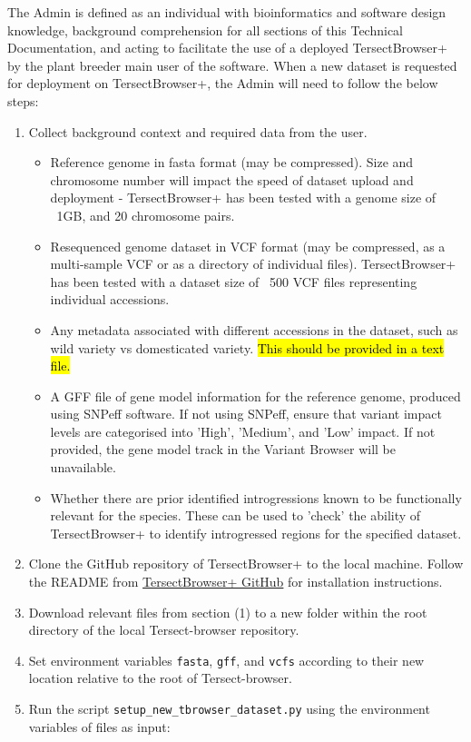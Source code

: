 \documentclass[12pt]{article}
\begin{document}
The Admin is defined as an individual with bioinformatics and software design knowledge, background comprehension for all sections of this Technical Documentation, and acting to facilitate the use of a deployed TersectBrowser+ by the plant breeder main user of the software. When a new dataset is requested for deployment on TersectBrowser+, the Admin will need to follow the below steps:
\begin{enumerate}
    \item Collect background context and required data from the user.
\begin{itemize}
    \item Reference genome in fasta format (may be compressed). Size and chromosome number will impact the speed of dataset upload and deployment - TersectBrowser+ has been tested with a genome size of ~1GB, and 20 chromosome pairs.
    \item Resequenced genome dataset in VCF format (may be compressed, as a multi-sample VCF or as a directory of individual files). TersectBrowser+ has been tested with a dataset size of ~500 VCF files representing individual accessions. 
    \item Any metadata associated with different accessions in the dataset, such as wild variety vs domesticated variety. \hl{This should be provided in a text file.}
    \item A GFF file of gene model information for the reference genome, produced using SNPeff software. If not using SNPeff, ensure that variant impact levels are categorised into 'High', 'Medium', and 'Low' impact. If not provided, the gene model track in the Variant Browser will be unavailable. 
    \item Whether there are prior identified introgressions known to be functionally relevant for the species. These can be used to 'check' the ability of TersectBrowser+ to identify introgressed regions for the specified dataset.
\end{itemize}
    \item Clone the GitHub repository of TersectBrowser+ to the local machine. Follow the README from \hyperlink {https://github.com/Tersect-Browser/Tersect-browser.git}{TersectBrowser+ GitHub} for installation instructions.
    \item Download relevant files from section (1) to a new folder within the root directory of the local Tersect-browser repository.
    \item Set environment variables \verb+fasta+, \verb+gff+, and \verb+vcfs+ according to their new location relative to the root of Tersect-browser.
    \item Run the script \verb+setup_new_tbrowser_dataset.py+ using the environment variables of files as input:
    

\end{enumerate}
\end{document}
